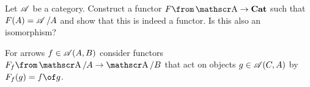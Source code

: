 \begin{exercise}
  Let $\operatorname{\mathscr A}$ be a category. Construct a functor $F\from \A\to\mathbf{Cat}$ such that $F(A)=\operatorname{\mathscr A}/A$ and show that this is indeed a functor. Is this also an isomorphism?

  \begin{hint}
    For arrows $f\in\operatorname{\mathscr A}(A,B)$ consider functors $F_f\from\A/A\to\A/B$ that act on objects $g\in \operatorname{\mathscr A}(C,A)$ by $F_f(g)=f\of g$.
  \end{hint}
\end{exercise}









